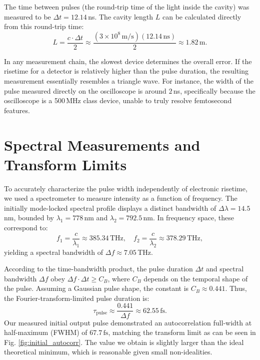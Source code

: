 \documentclass[twocolumn,10pt,a4paper]{article}
\begin{document}
The time between pulses (the round-trip time of the light inside the cavity) was measured to be $\Delta t = 12.14$\,ns. The cavity length $L$ can be calculated directly from this round-trip time:
\begin{equation}
    L = \frac{c \cdot \Delta t}{2} \approx \frac{(3 \times 10^8\,\text{m/s})(12.14\,\text{ns})}{2} \approx 1.82\,\text{m}.
\end{equation}

In any measurement chain, the slowest device determines the overall error. If the risetime for a detector is relatively higher than the pulse duration, the resulting measurement essentially resembles a triangle wave. For instance, the width of the pulse measured directly on the oscilloscope is around $2$\,ns, specifically because the oscilloscope is a 500\,MHz class device, unable to truly resolve femtosecond features.

\section{Spectral Measurements and Transform Limits}
To accurately characterize the pulse width independently of electronic risetime, we used a spectrometer to measure intensity as a function of frequency. The initially mode-locked spectral profile displays a distinct bandwidth of $\Delta \lambda = 14.5$\,nm, bounded by $\lambda_1 = 778$\,nm and $\lambda_2 = 792.5$\,nm. 
In frequency space, these correspond to:
\begin{equation}
    f_1 = \frac{c}{\lambda_1} \approx 385.34\,\text{THz}, \quad f_2 = \frac{c}{\lambda_2} \approx 378.29\,\text{THz},
\end{equation}
yielding a spectral bandwidth of $\Delta f \approx 7.05$\,THz.

According to the time-bandwidth product, the pulse duration $\Delta t$ and spectral bandwidth $\Delta f$ obey $\Delta f \cdot \Delta t \ge C_B$, where $C_B$ depends on the temporal shape of the pulse. Assuming a Gaussian pulse shape, the constant is $C_B \approx 0.441$. Thus, the Fourier-transform-limited pulse duration is:
\begin{equation}
    \tau_{\text{pulse}} \approx \frac{0.441}{\Delta f} \approx 62.55\,\text{fs}.
\end{equation}
Our measured initial output pulse demonstrated an autocorrelation full-width at half-maximum (FWHM) of $67.7\,\text{fs}$, matching the transform limit as can be seen in Fig. \ref{fig:initial_autocorr}. The value we obtain is slightly larger than the ideal theoretical minimum, which is reasonable given small non-idealities. 
\end{document}
